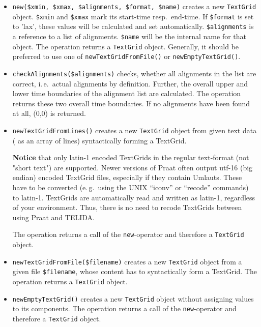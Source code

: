 \documentclass[a4,twoside=off,draft=true]{scrartcl}
\begin{document}
\begin{itemize}
\item {\tt new(\$xmin, \$xmax, \$alignments, \$format, \$name)} creates a new {\tt TextGrid} object. 
{\tt \$xmin} and {\tt \$xmax} mark its start-time resp.\ end-time. 
If {\tt \$format} is set to 'lax', these values will be calculated and set automatically. 
{\tt \$alignments} is a reference to a list of alignments. {\tt \$name} will be the internal name for that object.
The operation returns a {\tt TextGrid} object. 
Generally, it should be preferred to use one of {\tt newTextGridFromFile()} or {\tt newEmptyTextGrid()}.

\item {\tt checkAlignments(\$alignments)} checks, 
whether all alignments in the list are correct, i.\,e.\ actual alignments by definition. 
Further, the overall upper and lower time boundaries of the alignment list are calculated. 
The operation returns these two overall time boundaries. If no alignments have been found at all, (0,0) is returned.  

\item {\tt newTextGridFromLines(\textbackslash@lines)} creates a new {\tt TextGrid} object 
from given text data ({\tt \textbackslash@lines} as an array of lines) syntactically forming a TextGrid.

{\bf Notice} that only latin-1 encoded TextGrids in the regular text-format (not "short text") are supported. 
Newer versions of Praat often output utf-16 (big endian) encoded TextGrid files, especially if they contain Umlauts.
These have to be converted (e.\,g.\ using the UNIX ``iconv'' or ``recode'' commands) to latin-1. 
TextGrids are automatically read and written as latin-1, regardless of your environment. Thus, there is no need
to recode TextGrids between using Praat and TELIDA.

The operation returns a call of the {\tt new}-operator and therefore a {\tt TextGrid} object. 
  
\item {\tt newTextGridFromFile(\$filename)} creates a new {\tt TextGrid} object 
from a given file {\tt \$filename}, whose content has to syntactically form a TextGrid. 
The operation returns a {\tt TextGrid} object.


\item {\tt newEmptyTextGrid()} creates a new {\tt TextGrid} object without assigning values to its components. 
The operation returns a call of the {\tt new}-operator and therefore a {\tt TextGrid} object.


\end{itemize}
\end{document}
